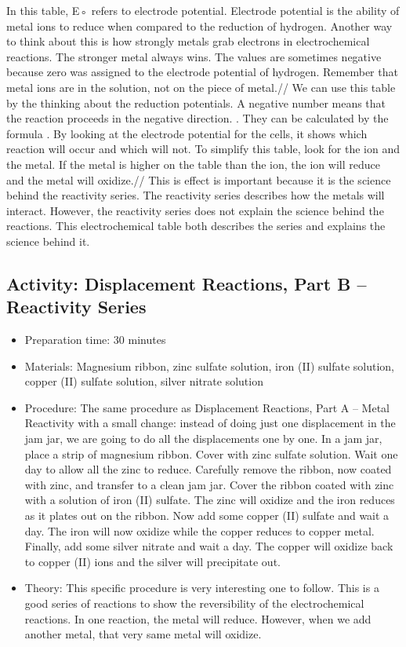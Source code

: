 \begin{itemize}
{\begin{itemize}
\begin{itemize}
{In this table, E◦ refers to electrode potential. Electrode potential is the ability of metal ions to reduce when compared to the reduction of hydrogen. Another way to think about this is how strongly metals grab electrons in electrochemical reactions. The stronger metal always wins. The values are sometimes negative because zero was assigned to the electrode potential of hydrogen. Remember that metal ions are in the solution, not on the piece of metal.//
We can use this table by the thinking about the reduction potentials. A negative number means that the reaction proceeds in the negative direction. . They can be calculated by the formula . By looking at the electrode potential for the cells, it shows which reaction will occur and which will not. To simplify this table, look for the ion and the metal. If the metal is higher on the table than the ion, the ion will reduce and the metal will oxidize.//
This is effect is important because it is the science behind the reactivity series. The reactivity series describes how the metals will interact. However, the reactivity series does not explain the science behind the reactions. This electrochemical table both describes the series and explains the science behind it.}
\end{itemize}

\subsection{Activity: Displacement Reactions, Part B – Reactivity Series}
\begin{itemize}
\item{Preparation time: 30 minutes}
\item{Materials: Magnesium ribbon, zinc sulfate solution, iron (II) sulfate solution, copper (II) sulfate solution, silver nitrate solution}
\item{Procedure: The same procedure as Displacement Reactions, Part A – Metal Reactivity with a small change: instead of doing just one displacement in the jam jar, we are going to do all the displacements one by one. In a jam jar, place a strip of magnesium ribbon. Cover with zinc sulfate solution. Wait one day to allow all the zinc to reduce. Carefully remove the ribbon, now coated with zinc, and transfer to a clean jam jar. Cover the ribbon coated with zinc with a solution of iron (II) sulfate. The zinc will oxidize and the iron reduces as it plates out on the ribbon. Now add some copper (II) sulfate and wait a day. The iron will now oxidize while the copper reduces to copper metal. Finally, add some silver nitrate and wait a day. The copper will oxidize back to copper (II) ions and the silver will precipitate out.}
\item{Theory: This specific procedure is very interesting one to follow. This is a good series of reactions to show the reversibility of the electrochemical reactions. In one reaction, the metal will reduce. However, when we add another metal, that very same metal will oxidize.}
\end{itemize}


\end{itemize}}
\end{itemize}
